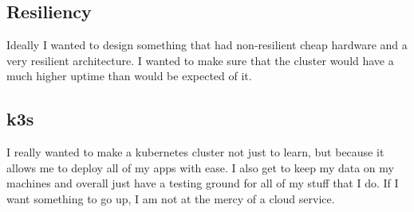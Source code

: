 \documentclass[12pt]{article}
\begin{document}
\subsection{Resiliency}
Ideally I wanted to design something that had non-resilient cheap hardware and a very resilient architecture. I wanted to make sure that the cluster would have a much higher uptime than would be expected of it.

\subsection{k3s}
I really wanted to make a kubernetes cluster not just to learn, but because it allows me to deploy all of my apps with ease. I also get to keep my data on my machines and overall just have a testing ground for all of my stuff that I do. If I want something to go up, I am not at the mercy of a cloud service.
\end{document}
